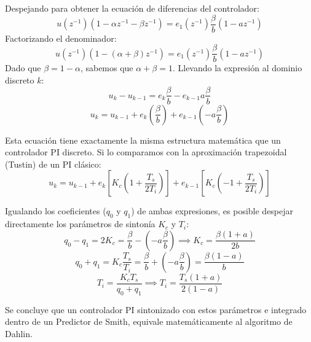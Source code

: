 Despejando para obtener la ecuación de diferencias del controlador:
\[
  u(z^{-1})(1 - \alpha z^{-1} - \beta z^{-1}) = e_1(z^{-1})\frac{\beta}{b}(1 - az^{-1})
\]
Factorizando el denominador:
\[
  u(z^{-1}) \left( 1 - (\alpha + \beta) z^{-1} \right) = e_1(z^{-1})\frac{\beta}{b}(1 - az^{-1})
\]
Dado que $\beta = 1 - \alpha$, sabemos que $\alpha + \beta = 1$. Llevando la expresión al dominio discreto $k$:
\[
  u_k - u_{k-1} = e_k\frac{\beta}{b} - e_{k-1}a\frac{\beta}{b}
\]
\[
  u_k = u_{k-1} + e_k \left( \frac{\beta}{b} \right) + e_{k-1} \left( -a\frac{\beta}{b} \right)
\]

Esta ecuación tiene exactamente la misma estructura matemática que un controlador PI discreto. Si lo comparamos con la aproximación trapezoidal (Tustin) de un PI clásico:
\[
  u_k = u_{k-1} + e_k \left[ K_c \left(1 + \frac{T_s}{2T_i}\right) \right] + e_{k-1} \left[ K_c \left(-1 + \frac{T_s}{2T_i}\right) \right]
\]

Igualando los coeficientes ($q_0$ y $q_1$) de ambas expresiones, es posible despejar directamente los parámetros de sintonía $K_c$ y $T_i$:
\[
  q_0 - q_1 = 2K_c = \frac{\beta}{b} - \left(-a\frac{\beta}{b}\right) \implies K_c = \frac{\beta(1+a)}{2b}
\]
\[
  q_0 + q_1 = K_c\frac{T_s}{T_i} = \frac{\beta}{b} + \left(-a\frac{\beta}{b}\right) = \frac{\beta(1-a)}{b}
\]
\[
  T_i = \frac{K_c T_s}{q_0 + q_1} \implies T_i = \frac{T_s(1+a)}{2(1-a)}
\]

Se concluye que un controlador PI sintonizado con estos parámetros e integrado dentro de un Predictor de Smith, equivale matemáticamente al algoritmo de Dahlin.
